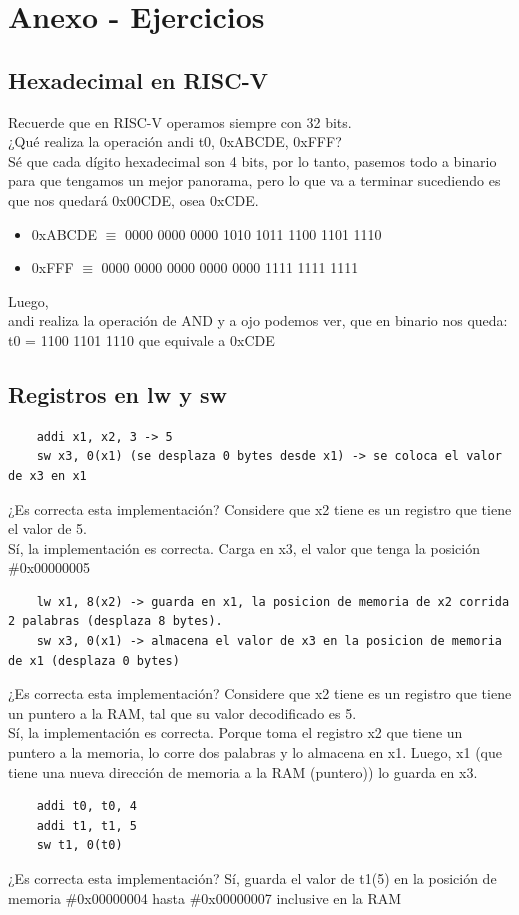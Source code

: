 \documentclass[10pt,a4paper]{article}
\begin{document}
\section*{Anexo - Ejercicios}
\subsection*{Hexadecimal en RISC-V}
Recuerde que en RISC-V operamos siempre con 32 bits. \\

¿Qué realiza la operación andi t0, 0xABCDE, 0xFFF? \\
Sé que cada dígito hexadecimal son 4 bits, por lo tanto, pasemos todo a binario para que tengamos un mejor panorama, pero lo que va a terminar sucediendo es que nos quedará 0x00CDE, osea 0xCDE. 
\begin{itemize}
    \item 0xABCDE $\equiv$ 0000  0000  0000 1010  1011  1100  1101  1110 
    \item 0xFFF $\equiv$ 0000  0000  0000  0000 0000  1111  1111  1111  
\end{itemize} 
Luego, \\
andi realiza la operación de AND y a ojo podemos ver, que en binario nos queda: t0 = 1100 1101 1110 que equivale a 0xCDE
\subsection*{Registros en lw y sw}
\label{subsec:punteros_ram_registros}
\begin{lstlisting}
    addi x1, x2, 3 -> 5
    sw x3, 0(x1) (se desplaza 0 bytes desde x1) -> se coloca el valor de x3 en x1
\end{lstlisting}
¿Es correcta esta implementación? Considere que x2 tiene es un registro que tiene el valor de 5. \\
Sí, la implementación es correcta. Carga en x3, el valor que tenga la posición \#0x00000005 \\ 
\begin{lstlisting}
    lw x1, 8(x2) -> guarda en x1, la posicion de memoria de x2 corrida 2 palabras (desplaza 8 bytes).
    sw x3, 0(x1) -> almacena el valor de x3 en la posicion de memoria de x1 (desplaza 0 bytes)
\end{lstlisting}
¿Es correcta esta implementación? Considere que x2 tiene es un registro que tiene un puntero a la RAM, tal que su valor decodificado es 5. \\
Sí, la implementación es correcta. Porque toma el registro x2 que tiene un puntero a la memoria, lo corre dos palabras y lo almacena en x1. Luego, x1 (que tiene una nueva dirección de memoria a la RAM (puntero)) lo guarda en x3. \\ 
\begin{lstlisting}
    addi t0, t0, 4
    addi t1, t1, 5
    sw t1, 0(t0)
\end{lstlisting}
¿Es correcta esta implementación? Sí, guarda el valor de t1(5) en la posición de memoria \#0x00000004 hasta \#0x00000007 inclusive en la RAM
\end{document}
